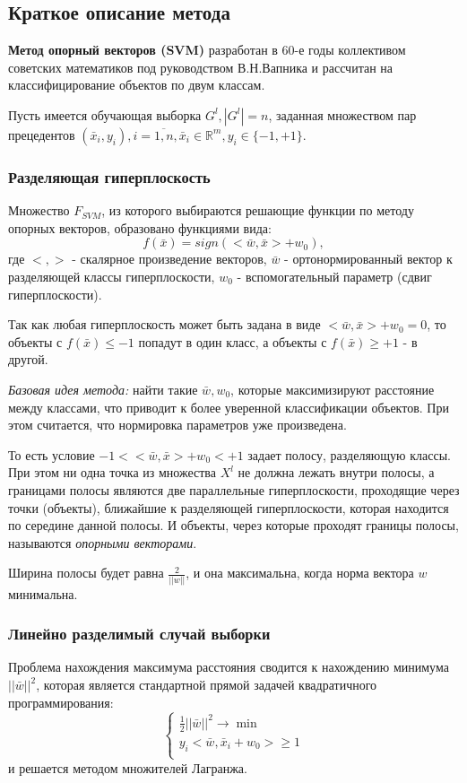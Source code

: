 \documentclass[12pt,a4paper]{article}
\begin{document}
\subsection{Краткое описание метода}
\textbf{Метод опорный векторов (SVM)} разработан в 60-е годы коллективом советских математиков под руководством В.Н.Вапника и рассчитан на классифицирование объектов по двум классам.

Пусть имеется обучающая выборка $G^l,|G^l|=n$, заданная множеством пар прецедентов $(\bar{x}_i,y_i),i=\overline{1,n},\bar{x}_i\in\mathbb{R}^m,y_i\in\{-1,+1\}$.

\subsubsection{Разделяющая гиперплоскость}
Множество $F_{SVM}$, из которого выбираются решающие функции по методу опорных векторов, образовано функциями вида:
\begin{equation}
    f(\bar{x})=sign(<\bar{w},\bar{x}>+w_0),
\end{equation}
где $<,>$ - скалярное произведение векторов, $\bar{w}$ - ортонормированный вектор к разделяющей классы гиперплоскости, $w_0$ - вспомогательный параметр (сдвиг гиперплоскости).

Так как любая гиперплоскость может быть задана в виде $<\bar{w},\bar{x}>+w_0=0$, то объекты с $f(\bar{x})\leq-1$ попадут в один класс, а объекты с $f(\bar{x})\geq+1$ - в другой.

\textit{Базовая идея метода:} найти такие $\bar{w},w_0$, которые максимизируют расстояние между классами, что приводит к более уверенной классификации объектов. При этом считается, что нормировка параметров уже произведена.

То есть условие $-1<<\bar{w},\bar{x}>+w_0<+1$ задает полосу, разделяющую классы. При этом ни одна точка из множества $X^l$ не должна лежать внутри полосы, а границами полосы являются две параллельные гиперплоскости, проходящие через точки (объекты), ближайшие к разделяющей гиперплоскости, которая находится по середине данной полосы. И объекты, через которые проходят границы полосы, называются \textit{опорными векторами}.

Ширина полосы будет равна $\frac{2}{||w||}$, и она максимальна, когда норма вектора $w$ минимальна.

\subsubsection{Линейно разделимый случай выборки}
Проблема нахождения максимума расстояния сводится к нахождению минимума $||\bar{w}||^2$, которая является стандартной прямой задачей квадратичного программирования:
\begin{equation}
    \left\{
    \begin{array}{ll}
        \frac{1}{2}||\bar{w}||^2\rightarrow\min\\
        y_i<\bar{w},\bar{x}_i+w_0>\geq1\\
    \end{array}
    \right.
\end{equation}
и решается методом множителей Лагранжа.
\end{document}
